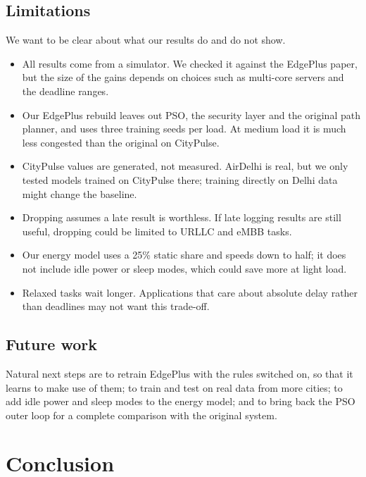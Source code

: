 \documentclass[11pt]{article}
\theoremstyle{definition}
\begin{document}
\subsection{Limitations}
We want to be clear about what our results do and do not show.
\begin{itemize}
\item All results come from a simulator. We checked it against the EdgePlus paper, but the size of the gains
depends on choices such as multi-core servers and the deadline ranges.
\item Our EdgePlus rebuild leaves out PSO, the security layer and the original path planner, and uses three
training seeds per load. At medium load it is much less congested than the original on CityPulse.
\item CityPulse values are generated, not measured. AirDelhi is real, but we only tested models trained on
CityPulse there; training directly on Delhi data might change the baseline.
\item Dropping assumes a late result is worthless. If late logging results are still useful, dropping could be
limited to URLLC and eMBB tasks.
\item Our energy model uses a 25\% static share and speeds down to half; it does not include idle power or sleep
modes, which could save more at light load.
\item Relaxed tasks wait longer. Applications that care about absolute delay rather than deadlines may not want
this trade-off.
\end{itemize}

\subsection{Future work}
Natural next steps are to retrain EdgePlus with the rules switched on, so that it learns to make use of them; to
train and test on real data from more cities; to add idle power and sleep modes to the energy model; and to
bring back the PSO outer loop for a complete comparison with the original system.

\section{Conclusion}
\end{document}
